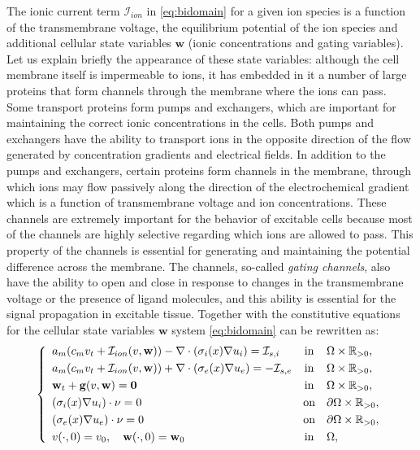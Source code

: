 \documentclass[10pt]{article}
\def\dis{\displaystyle}
\def\0vec{\mathbf{0}}
\def\\Phivec{\mathbf{\Phi}}
\def\gvec{\mathbf{g}}
\def\wvec{\mathbf{w}}
\begin{document}
    The ionic current term $\mathcal{I}_{ion}$ in \eqref{eq:bidomain} for a given ion species is a function of the
    transmembrane voltage, the equilibrium potential of the ion species and additional cellular state variables $\wvec$  (ionic concentrations and gating variables).
    Let us explain briefly the appearance of these state variables: although the cell membrane itself is impermeable to ions, it has embedded in it a number of
    large proteins that form channels through the membrane where the ions can pass. Some transport proteins form pumps and
    exchangers, which are important for maintaining the correct ionic concentrations in the cells. Both pumps and exchangers
    have the ability to transport ions in the opposite direction of the flow generated by concentration gradients and electrical
    fields.
    In addition to the pumps and exchangers, certain proteins form channels in the membrane,
    through which ions may flow passively along the direction of the electrochemical gradient
    which is a function of transmembrane voltage and ion concentrations.
    These channels are extremely important for the behavior of excitable cells
    because most of the channels are highly selective regarding which ions are allowed to pass.
    This property of the channels is essential for generating and maintaining the potential difference across the membrane.
    The channels, so-called {\it gating channels}, also have the ability to open and close
    in response to changes in the transmembrane voltage or the presence of ligand molecules,
    and this ability is essential for the signal propagation in excitable tissue.
    Together with the constitutive equations for the cellular state variables $\wvec$ system
    \eqref{eq:bidomain} can be rewritten as:
\begin{equation}\label{eq:bidomain_ion}
    \left\{
        \begin{array}{lcl}
a_m(c_mv_t+\mathcal{I}_{ion}(v,\wvec))-\nabla\cdot(\sigma_i(x)\nabla u_i)=\mathcal{I}_{s,i}
        &\mbox{in}&    \Omega \times \mathbb{R}_{>0},         \\
        \noalign{\smallskip}\dis
a_m(c_mv_t+\mathcal{I}_{ion}(v,\wvec))+\nabla\cdot(\sigma_e(x)\nabla u_e)=-\mathcal{I}_{s,e}
        &\mbox{in}&    \Omega \times \mathbb{R}_{>0},         \\
        \noalign{\smallskip}\dis
        \wvec_t   +\gvec(v,\wvec)= \0vec
        &\mbox{in}&    \Omega \times \mathbb{R}_{>0},         \\
        \noalign{\smallskip}\dis
        (\sigma_i(x)\nabla u_i)\cdot \nu = 0
        &\mbox{on}&    \partial \Omega \times \mathbb{R}_{>0},    \\
        \noalign{\smallskip}\dis
        (\sigma_e(x)\nabla u_e)\cdot \nu = 0
        &\mbox{on}&    \partial \Omega \times \mathbb{R}_{>0},    \\
        \noalign{\smallskip}\dis
        v(\cdot,0) =v_0,\quad \wvec(\cdot,0) =\wvec_0
        &\mbox{in}&    \Omega,
        \end{array}
    \right.
\end{equation}
\end{document}
